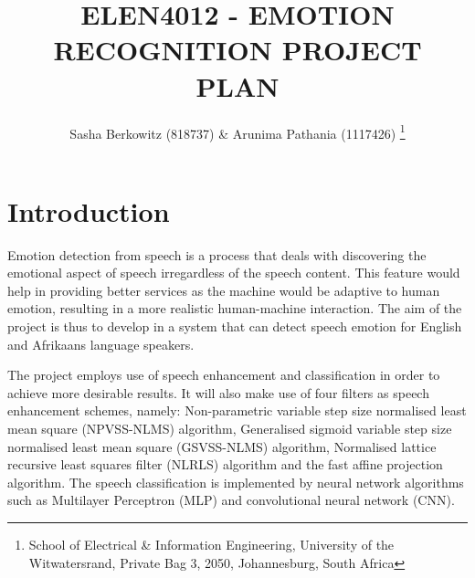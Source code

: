 \documentclass[10pt,twocolumn]{witseiepaper}
\begin{document}
\title{ELEN4012 - EMOTION RECOGNITION PROJECT PLAN}

\author{Sasha Berkowitz (818737) \& Arunima Pathania (1117426)
	\thanks{School of Electrical \& Information Engineering, University of the
		Witwatersrand, Private Bag 3, 2050, Johannesburg, South Africa}
}
	


	\maketitle
	
	\vspace{7pt}
\section{Introduction}
Emotion detection from speech is a process that deals with discovering the emotional aspect of speech irregardless of the speech content. This feature would help in providing better services as the machine would be adaptive to human emotion, resulting in a more realistic human-machine interaction. The aim of the project is thus to develop in a system that can detect speech emotion for English and Afrikaans language speakers.

The project employs use of speech enhancement and classification in order to achieve more desirable results.
It will also make use of four filters as speech enhancement schemes, namely:  Non-parametric variable step size normalised least mean square (NPVSS-NLMS) algorithm, Generalised sigmoid variable step size normalised least mean square (GSVSS-NLMS) algorithm, Normalised lattice recursive least squares filter (NLRLS) algorithm and the fast affine projection algorithm. The speech classification is implemented by neural network algorithms such as Multilayer Perceptron (MLP) and convolutional neural network (CNN).
\end{document}
